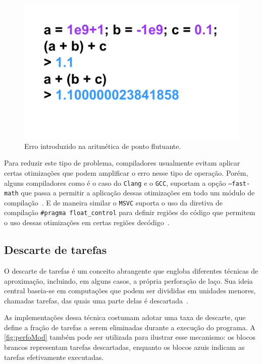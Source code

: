 \begin{figure}[htb]
    \caption{Erro introduzido na aritmética de ponto flutuante.}
    \label{fig:floatPoint}
    \includegraphics[scale=0.7]{Figuras/fastmath.pdf}
    \fonte{}
\end{figure}

Para reduzir este tipo de problema, compiladores usualmente evitam aplicar certas otimizações que podem amplificar o erro nesse tipo de operação. Porém, alguns compiladores como é o caso do \texttt{Clang} e o \texttt{GCC}, suportam a opção \texttt{--fast-math} que passa a permitir a aplicação dessas otimizações em todo um módulo de compilação~\cite{gccffast, clangffast}. E de maneira similar o \texttt{MSVC} suporta o uso da diretiva de compilação \texttt{\#pragma float\_control} para definir regiões do código que permitem o uso dessas otimizações em certas regiões decódigo~\cite{msvcfast}.

\subsection{Descarte de tarefas}\label{subsec:descTar}

O descarte de tarefas é um conceito abrangente que engloba diferentes técnicas de aproximação, incluindo, em alguns casos, a própria perforação de laço. Sua ideia central baseia-se em computações que podem ser divididas em unidades menores, chamadas tarefas, das quais uma parte delas é descartada~\cite{mittal2016}.

As implementações dessa técnica costumam adotar uma taxa de descarte, que define a fração de tarefas a serem eliminadas durante a execução do programa. A \autoref{fig:perfoMod} também pode ser utilizada para ilustrar esse mecanismo: os blocos brancos representam tarefas descartadas, enquanto os blocos azuis indicam as tarefas efetivamente executadas.

